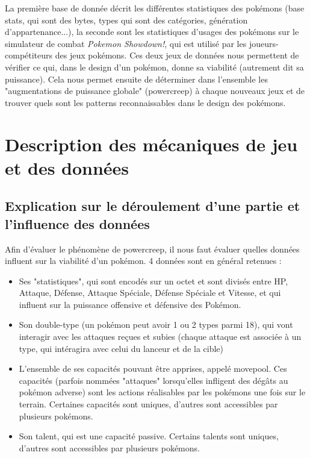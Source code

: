\documentclass[a4paper,12pt]{article}
\begin{document}
La première base de donnée décrit les différentes statistiques des pokémons
(base stats, qui sont des bytes, types qui sont des catégories, génération
d'appartenance...), la seconde sont les statistiques d'usages des pokémons sur
le simulateur de combat \textit{Pokemon Showdown!}, qui est utilisé par les
joueurs-compétiteurs des jeux pokémons. Ces deux jeux de données nous permettent
de vérifier ce qui, dans le design d'un pokémon, donne sa viabilité (autrement
dit sa puissance). Cela nous permet ensuite de déterminer dans l'ensemble les
"augmentations de puissance globale" (powercreep) à chaque nouveaux jeux et de
trouver quels sont les patterns reconnaissables dans le design des pokémons.

\section{Description des mécaniques de jeu et des données}
\subsection{Explication sur le déroulement d'une partie et l'influence des données}

Afin d'évaluer le phénomène de powercreep, il nous faut évaluer quelles données
influent sur la viabilité d'un pokémon. 4 données sont en général retenues :

\begin{itemize}
    \item Ses "statistiques", qui sont encodés sur un octet et sont divisés
    entre HP, Attaque, Défense, Attaque Spéciale, Défense Spéciale et Vitesse,
    et qui influent sur la puissance offensive et défensive des Pokémon.
    \item Son double-type (un pokémon peut avoir 1 ou 2 types parmi 18), qui
    vont interagir avec les attaques reçues et subies (chaque attaque est
    associée à un type, qui intéragira avec celui du lanceur et de la cible)
    \item L'ensemble de ses capacités pouvant être apprises, appelé movepool.
    Ces capacités (parfois nommées "attaques" lorsqu'elles infligent des dégâts
    au pokémon adverse) sont les actions réalisables par les pokémons une fois
    sur le terrain. Certaines capacités sont uniques, d'autres sont accessibles
    par plusieurs pokémons.
    \item Son talent, qui est une capacité passive. Certains talents sont
    uniques, d'autres sont accessibles par plusieurs pokémons.
\end{itemize}
\end{document}
